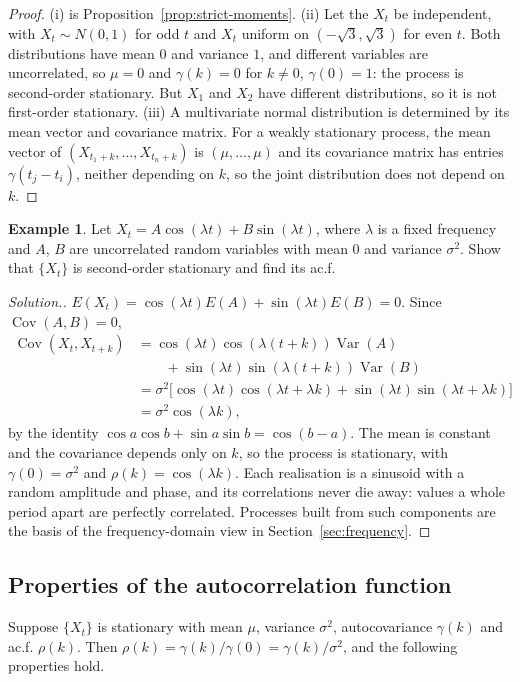 \documentclass[11pt,a4paper]{article}
\theoremstyle{definition}
\newtheorem{exa}[thm]{Example}
\newenvironment{solution}
  {\renewcommand{\qedsymbol}{}\begin{proof}[\textit{Solution}.]}
  {\end{proof}}
\DeclareMathOperator{\Var}{Var}
\DeclareMathOperator{\Cov}{Cov}
\begin{document}
\begin{proof}
(i) is Proposition~\ref{prop:strict-moments}. (ii) Let the $X_t$ be independent, with $X_t \sim N(0, 1)$ for odd $t$ and $X_t$ uniform on $(-\sqrt3, \sqrt3)$
for even $t$. Both distributions have mean $0$ and variance $1$, and different variables are uncorrelated, so $\mu = 0$ and
$\gamma(k) = 0$ for $k \ne 0$, $\gamma(0) = 1$: the process is second-order stationary. But $X_1$ and $X_2$ have different distributions, so it is not
first-order stationary. (iii) A multivariate normal distribution is determined by its mean vector and covariance
matrix. For a weakly stationary process, the mean vector of $(X_{t_1+k}, \dots, X_{t_n+k})$ is $(\mu, \dots, \mu)$ and its covariance matrix has entries
$\gamma(t_j - t_i)$, neither depending on $k$, so the joint distribution does not depend on $k$.
\end{proof}

\begin{exa}\label{exa:harmonic}
Let $X_t = A\cos(\lambda t) + B\sin(\lambda t)$, where $\lambda$ is a fixed frequency and $A$, $B$ are uncorrelated random variables with mean $0$
and variance $\sigma^2$. Show that $\{X_t\}$ is second-order stationary and find its ac.f.
\end{exa}

\begin{solution}
$E(X_t) = \cos(\lambda t)E(A) + \sin(\lambda t)E(B) = 0$. Since $\Cov(A, B) = 0$,
\begin{align*}
\Cov(X_t, X_{t+k}) &= \cos(\lambda t)\cos(\lambda(t + k))\Var(A) \\
&\qquad + \sin(\lambda t)\sin(\lambda(t + k))\Var(B) \\
&= \sigma^2\bigl[\cos(\lambda t)\cos(\lambda t + \lambda k) + \sin(\lambda t)\sin(\lambda t + \lambda k)\bigr] \\
&= \sigma^2\cos(\lambda k) ,
\end{align*}
by the identity $\cos a\cos b + \sin a\sin b = \cos(b - a)$. The mean is constant and the covariance depends only on $k$, so the
process is stationary, with $\gamma(0) = \sigma^2$ and $\rho(k) = \cos(\lambda k)$. Each realisation is a sinusoid with a random amplitude and
phase, and its correlations never die away: values a whole period apart are perfectly correlated. Processes
built from such components are the basis of the frequency-domain view in Section~\ref{sec:frequency}.
\end{solution}

\subsection{Properties of the autocorrelation function}
Suppose $\{X_t\}$ is stationary with mean $\mu$, variance $\sigma^2$, autocovariance $\gamma(k)$ and ac.f. $\rho(k)$. Then $\rho(k) = \gamma(k)/\gamma(0) = \gamma(k)/\sigma^2$,
and the following properties hold.
\end{document}
